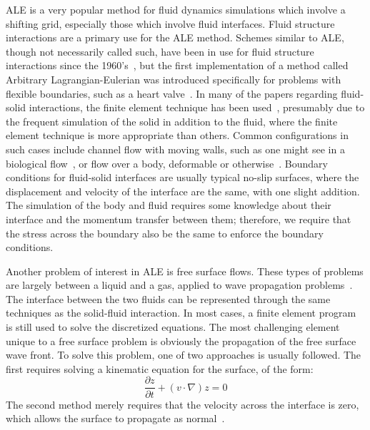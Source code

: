 \documentclass{article}
\def\pp#1#2{\frac{\partial #1}{\partial #2}}
\begin{document}
ALE is a very popular method for fluid dynamics simulations which involve a shifting grid, especially those which involve fluid interfaces.  Fluid structure interactions are a primary use for the ALE method.  Schemes similar to ALE, though not necessarily called such, have been in use for fluid structure interactions since the 1960's~\cite{noh63,trulio66}, but the first implementation of a method called Arbitrary Lagrangian-Eulerian was introduced specifically for problems with flexible boundaries, such as a heart valve~\cite{hirt74}.  In many of the papers regarding fluid-solid interactions, the finite element technique has been used~\cite{hron06,letallec01,souli00}, presumably due to the frequent simulation of the solid in addition to the fluid, where the finite element technique is more appropriate than others.  Common configurations in such cases include channel flow with moving walls, such as one might see in a biological flow~\cite{hron06}, or flow over a body, deformable or otherwise~\cite{farhat05}.  Boundary conditions for fluid-solid interfaces are usually typical no-slip surfaces, where the displacement and velocity of the interface are the same, with one slight addition.  The simulation of the body and fluid requires some knowledge about their interface and the momentum transfer between them; therefore, we require that the stress across the boundary also be the same to enforce the boundary conditions.

Another problem of interest in ALE is free surface flows.  These types of problems are largely between a liquid and a gas, applied to wave propagation problems~\cite{braess00,lo04,nithiarasu05}.  The interface between the two fluids can be represented through the same techniques as the solid-fluid interaction.  In most cases, a finite element program is still used to solve the discretized equations.  The most challenging element unique to a free surface problem is obviously the propagation of the free surface wave front.  To solve this problem, one of two approaches is usually followed.  The first requires solving a kinematic equation for the surface, of the form:
\begin{equation}
  \pp{z}{t} + (v\cdot \nabla)z = 0
\end{equation}
The second method merely requires that the velocity across the interface is zero, which allows the surface to propagate as normal~\cite{sarrate01}.
\end{document}
